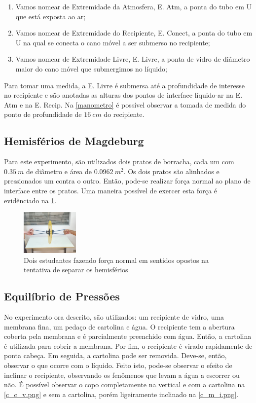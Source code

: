     \begin{enumerate}
        \item Vamos nomear de Extremidade da Atmosfera, E. Atm, a ponta do tubo em U que está exposta ao ar;
        \item Vamos nomear de Extremidade do Recipiente, E. Conect, a ponta do tubo em U na qual se conecta o cano móvel a ser submerso no recipiente;
        \item Vamos nomear de Extremidade Livre, E. Livre, a ponta de vidro de diâmetro maior do cano móvel que submergimos no líquido;
    \end{enumerate}


    Para tomar uma medida, a E. Livre é submersa até a profundidade de interesse no recipiente e são anotadas as alturas dos pontos de interface líquido-ar na E. Atm e na E. Recip. Na \cref{manometro} é possível observar a tomada de medida do ponto de profundidade de \(\qty{16}{cm}\) do recipiente.

\subsection{Hemisférios de Magdeburg}

    Para este experimento, são utilizados dois pratos de borracha, cada um com \(\qty{0,35}{m}\) de diâmetro e área de \(\qty{0,0962}{m^2}\). Os dois pratos são alinhados e pressionados um contra o outro. Então, pode-se realizar força normal ao plano de interface entre os pratos. Uma maneira possível de exercer esta força é evidênciado na \cref{foto_hemisferio.png}.

\begin{figure}[H]
    \centering
    \includegraphics[width=0.25\textwidth]{fig/Cortada.jpeg}
    \caption{Dois estudantes fazendo força normal em sentidos opostos na tentativa de separar os hemisférios}
    \label{foto_hemisferio.png}
\end{figure}


\subsection{Equilíbrio de Pressões}
    No experimento ora descrito, são utilizados: um recipiente de vidro, uma membrana fina, um pedaço de cartolina e água. O recipiente tem a abertura coberta pela membrana e é parcialmente preenchido com água. Então, a cartolina é utilizada para cobrir a membrana. Por fim, o recipiente é virado rapidamente de ponta cabeça. Em seguida, a cartolina pode ser removida. Deve-se, então, observar o que ocorre com o líquido. Feito isto, pode-se observar o efeito de inclinar o recipiente, observando os fenômenos que levam a água a escorrer ou não. É possível observar o copo completamente na vertical e com a cartolina na \cref{c_c_v.png} e sem a cartolina, porém ligeiramente inclinado na \cref{c_m_i.png}.

